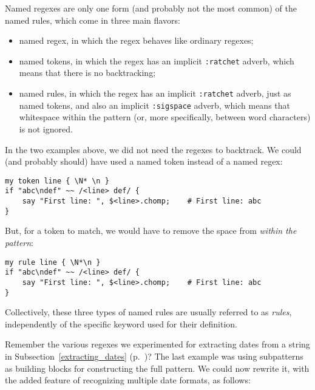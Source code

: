 Named regexes are only one form (and probably not the 
most common) of the named rules, which 
come in three main flavors:
\begin{itemize}
\item named regex, in which the regex behaves like ordinary 
regexes;
\item named tokens, in which the regex has an implicit 
{\tt :ratchet} adverb, which means that there is no 
backtracking;
\item named rules, in which the regex has an implicit 
{\tt :ratchet} adverb, just as named tokens, and also 
an implicit {\tt :sigspace} adverb, which means that 
whitespace within the pattern (or, more specifically, 
between word characters) is not ignored.
\end{itemize}

In the two examples above, we did not need the regexes 
to backtrack. We could (and probably should) have used 
a named token instead of a named regex:

\begin{verbatim}
my token line { \N* \n }
if "abc\ndef" ~~ /<line> def/ {
    say "First line: ", $<line>.chomp;    # First line: abc
}
\end{verbatim} 

But, for a token to match, we would have to remove the 
space from \emph{within the pattern}:

\begin{verbatim}
my rule line { \N*\n }
if "abc\ndef" ~~ /<line> def/ {
    say "First line: ", $<line>.chomp;    # First line: abc
}
\end{verbatim} 

Collectively, these three types of named rules are usually 
referred to as \emph{rules}, independently of the specific 
keyword used for their definition.

Remember the various regexes we experimented for 
extracting dates from a string in 
Subsection~\ref{extracting_dates} 
(p.~\pageref{extracting_dates})? The last example was 
using subpatterns as building blocks for constructing 
the full pattern. We could now rewrite it, with the 
added feature of recognizing multiple date formats, as 
follows:

